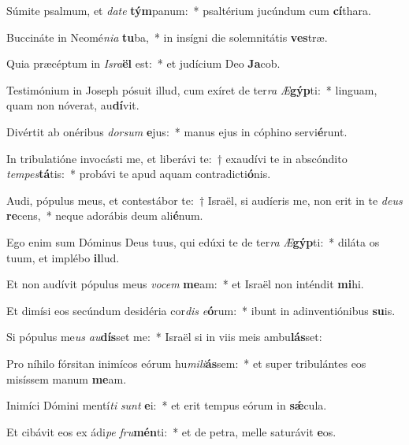 \item Súmite psalmum, et \textit{da}\textit{te} \textbf{tým}panum:~* psaltérium jucúndum cum \textbf{cí}thara.
\item Buccináte in Neomé\textit{ni}\textit{a} \textbf{tu}ba,~* in insígni die solemnitátis \textbf{ves}træ.
\item Quia præcéptum in \textit{Is}\textit{ra}\textbf{ël} est:~* et judícium Deo \textbf{Ja}cob.
\item Testimónium in Joseph pósuit illud, cum exíret de ter\textit{ra} \textit{Æ}\textbf{gýp}ti:~* linguam, quam non nóverat, au\textbf{dí}vit.
\item Divértit ab onéribus \textit{dor}\textit{sum} \textbf{e}jus:~* manus ejus in cóphino servi\textbf{é}runt.
\item In tribulatióne invocásti me, et liberávi te:~† exaudívi te in abscóndito \textit{tem}\textit{pes}\textbf{tá}tis:~* probávi te apud aquam contradicti\textbf{ó}nis.
\item Audi, pópulus meus, et contestábor te:~† Israël, si audíeris me, non erit in te \textit{de}\textit{us} \textbf{re}cens,~* neque adorábis deum ali\textbf{é}num.
\item Ego enim sum Dóminus Deus tuus, qui edúxi te de ter\textit{ra} \textit{Æ}\textbf{gýp}ti:~* diláta os tuum, et implébo \textbf{il}lud.
\item Et non audívit pópulus meus \textit{vo}\textit{cem} \textbf{me}am:~* et Israël non inténdit \textbf{mi}hi.
\item Et dimísi eos secúndum desidéria cor\textit{dis} \textit{e}\textbf{ó}rum:~* ibunt in adinventiónibus \textbf{su}is.
\item Si pópulus me\textit{us} \textit{au}\textbf{dís}set me:~* Israël si in viis meis ambu\textbf{lás}set:
\item Pro níhilo fórsitan inimícos eórum hu\textit{mi}\textit{li}\textbf{ás}sem:~* et super tribulántes eos misíssem manum \textbf{me}am.
\item Inimíci Dómini mentí\textit{ti} \textit{sunt} \textbf{e}i:~* et erit tempus eórum in \textbf{sǽ}cula.
\item Et cibávit eos ex ádi\textit{pe} \textit{fru}\textbf{mén}ti:~* et de petra, melle saturávit \textbf{e}os.

